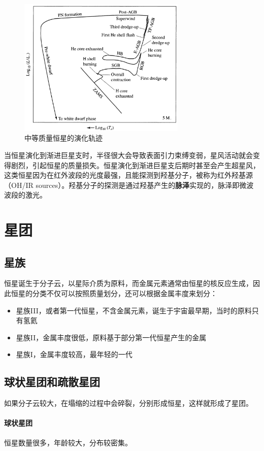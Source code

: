 \documentclass[openany]{ctexbook}
\begin{document}
\begin{figure}[hbt]
  \centering
  \includegraphics[width=8cm]{chapters/13/intermediate}
  \caption{中等质量恒星的演化轨迹}
  \label{}
\end{figure}

当恒星演化到渐进巨星支时，半径很大会导致表面引力束缚变弱，星风活动就会变得剧烈，引起恒星的质量损失。恒星演化到渐进巨星支后期时甚至会产生超星风，这类恒星因为在红外波段的光度最强，且能探测到羟基分子，被称为红外羟基源（OH/IR sources）。羟基分子的探测是通过羟基产生的\textbf{脉泽}实现的，脉泽即微波波段的激光。


\section{星团}
\subsection{星族}
恒星诞生于分子云，以星际介质为原料，而金属元素通常由恒星的核反应生成，因此恒星的分类不仅可以按照质量划分，还可以根据金属丰度来划分：
\begin{itemize}
  \item 星族III，或者第一代恒星，不含金属元素，诞生于宇宙最早期，当时的原料只有氢氦
  \item 星族II，金属丰度很低，原料基于部分第一代恒星产生的金属
  \item 星族I，金属丰度较高，最年轻的一代
\end{itemize}

\subsection{球状星团和疏散星团}
如果分子云较大，在塌缩的过程中会碎裂，分别形成恒星，这样就形成了星团。
\paragraph{球状星团}
恒星数量很多，年龄较大，分布较密集。
\end{document}
